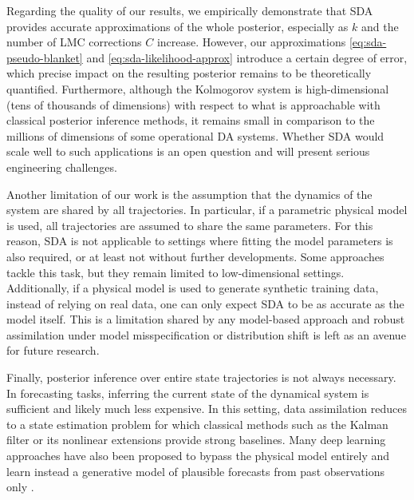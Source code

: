 Regarding the quality of our results, we empirically demonstrate that SDA provides accurate approximations of the whole posterior, especially as $k$ and the number of LMC corrections $C$ increase. However, our approximations \eqref{eq:sda-pseudo-blanket} and \eqref{eq:sda-likelihood-approx} introduce a certain degree of error, which precise impact on the resulting posterior remains to be theoretically quantified. Furthermore, although the Kolmogorov system is high-dimensional (tens of thousands of dimensions) with respect to what is approachable with classical posterior inference methods, it remains small in comparison to the millions of dimensions of some operational DA systems. Whether SDA would scale well to such applications is an open question and will present serious engineering challenges.

Another limitation of our work is the assumption that the dynamics of the system are shared by all trajectories. In particular, if a parametric physical model is used, all trajectories are assumed to share the same parameters. For this reason, SDA is not applicable to settings where fitting the model parameters is also required, or at least not without further developments. Some approaches \cite{archer2015black, maddison2017filtering, naesseth2018variational, lawson2022sixo} tackle this task, but they remain limited to low-dimensional settings. Additionally, if a physical model is used to generate synthetic training data, instead of relying on real data, one can only expect SDA to be as accurate as the model itself. This is a limitation shared by any model-based approach and robust assimilation under model misspecification or distribution shift is left as an avenue for future research.

Finally, posterior inference over entire state trajectories is not always necessary. In forecasting tasks, inferring the current state of the dynamical system is sufficient and likely much less expensive. In this setting, data assimilation reduces to a state estimation problem for which classical methods such as the Kalman filter \cite{kalman1960new} or its nonlinear extensions \cite{wan2000unscented, arasaratnam2009cubature} provide strong baselines. Many deep learning approaches have also been proposed to bypass the physical model entirely and learn instead a generative model of plausible forecasts from past observations only \cite{krishnan2015deep, girin2021dynamical, ravuri2021skilful, lam2023learning}.


